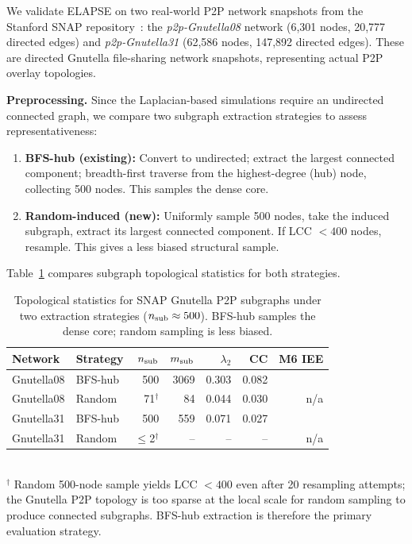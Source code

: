 \documentclass[review,12pt]{elsarticle}
\newcommand{\lambdat}{\lambda_2}
\begin{document}
We validate ELAPSE on two real-world P2P network snapshots from the
Stanford SNAP repository~\cite{snapnets,leskovec2007graph}: the
\emph{p2p-Gnutella08} network (6,301 nodes, 20,777 directed edges) and
\emph{p2p-Gnutella31} (62,586 nodes, 147,892 directed edges). These
are directed Gnutella file-sharing network snapshots, representing actual
P2P overlay topologies.

\textbf{Preprocessing.} Since the Laplacian-based simulations require an
undirected connected graph, we compare two subgraph extraction strategies
to assess representativeness:
\begin{enumerate}
  \item \textbf{BFS-hub (existing):} Convert to undirected; extract the largest
        connected component; breadth-first traverse from the highest-degree
        (hub) node, collecting 500 nodes. This samples the dense core.
  \item \textbf{Random-induced (new):} Uniformly sample 500 nodes, take the
        induced subgraph, extract its largest connected component. If LCC
        $< 400$ nodes, resample. This gives a less biased structural sample.
\end{enumerate}
Table~\ref{tab:snap_stats} compares subgraph topological statistics for
both strategies.

\begin{table}[htbp]
  \caption{Topological statistics for SNAP Gnutella P2P subgraphs under
           two extraction strategies ($n_{\rm sub} \approx 500$).
           BFS-hub samples the dense core; random sampling is less biased.}
  \label{tab:snap_stats}
  \centering
  \small
  \renewcommand{\arraystretch}{1.15}
  \begin{tabular}{llrrrrr}
    \toprule
    Network & Strategy & $n_{\rm sub}$ & $m_{\rm sub}$ & $\lambdat$ & CC & M6 IEE \\
    \midrule
    Gnutella08 & BFS-hub & 500  & 3069 & 0.303 & 0.082 &  \\
    Gnutella08 & Random  & 71$^\dagger$  & 84   & 0.044 & 0.030 & n/a \\
    Gnutella31 & BFS-hub & 500  & 559  & 0.071 & 0.027 &  \\
    Gnutella31 & Random  & $\leq$2$^\dagger$ & -- & --  & --    & n/a \\
    \bottomrule
  \end{tabular}
  \medskip\\
  \small$^\dagger$ Random 500-node sample yields LCC $< 400$ even after 20 resampling
  attempts; the Gnutella P2P topology is too sparse at the local scale for
  random sampling to produce connected subgraphs.  BFS-hub extraction is
  therefore the primary evaluation strategy.
\end{table}
\end{document}
